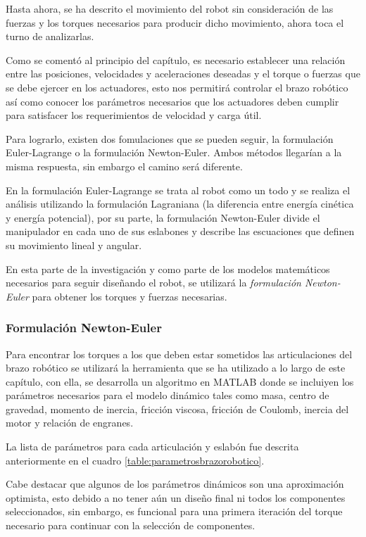 Hasta ahora, se ha descrito el movimiento del robot sin consideración de las fuerzas y los torques necesarios para producir dicho movimiento, ahora toca el turno de analizarlas.

Como se comentó al principio del capítulo, es necesario establecer una relación entre las posiciones, velocidades y aceleraciones deseadas y el torque o fuerzas que se debe ejercer en los actuadores, esto nos permitirá controlar el brazo robótico así como conocer los parámetros necesarios que los actuadores deben cumplir para satisfacer los requerimientos de velocidad y carga útil.

Para lograrlo, existen dos fomulaciones que se pueden seguir, la formulación Euler-Lagrange o la formulación Newton-Euler. Ambos métodos llegarían a la misma respuesta, sin embargo el camino será diferente.

En la formulación Euler-Lagrange se trata al robot como un todo y se realiza el análisis utilizando la formulación Lagraniana (la diferencia entre energía cinética y energía potencial), por su parte, la formulación Newton-Euler divide el manipulador en cada uno de sus eslabones y describe las escuaciones que definen su movimiento lineal y angular. \cite{Spong2005}

En esta parte de la investigación y como parte de los modelos matemáticos necesarios para seguir diseñando el robot, se utilizará la \textit{formulación Newton-Euler} para obtener los torques y fuerzas necesarias. 

\subsubsection{Formulación Newton-Euler}

Para encontrar los torques a los que deben estar sometidos las articulaciones del brazo robótico se utilizará la herramienta que se ha utilizado a lo largo de este capítulo, con ella, se desarrolla un algoritmo en MATLAB donde se incluiyen los parámetros necesarios para el modelo dinámico tales como masa, centro de gravedad, momento de inercia, fricción viscosa, fricción de Coulomb, inercia del motor y relación de engranes. 

La lista de parámetros para cada articulación y eslabón fue descrita anteriormente en el cuadro \ref{table:parametrosbrazorobotico}.

Cabe destacar que algunos de los parámetros dinámicos son una aproximación optimista, esto debido a no tener aún un diseño final ni todos los componentes seleccionados, sin embargo, es funcional para una primera iteración del torque necesario para continuar con la selección de componentes.

